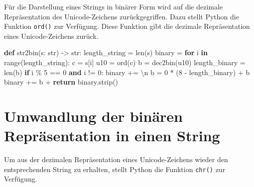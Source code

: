 \documentclass[
  nswissgerman,
  a4paper,
  DIV=11,
  numbers=noendperiod,
  ngerman]{scrreprt}
\newenvironment{Shaded}{\begin{snugshade}}{\end{snugshade}}
\newcommand{\BuiltInTok}[1]{\textcolor[rgb]{0.00,0.23,0.31}{#1}}
\newcommand{\CharTok}[1]{\textcolor[rgb]{0.13,0.47,0.30}{#1}}
\newcommand{\ControlFlowTok}[1]{\textcolor[rgb]{0.00,0.23,0.31}{\textbf{#1}}}
\newcommand{\DecValTok}[1]{\textcolor[rgb]{0.68,0.00,0.00}{#1}}
\newcommand{\KeywordTok}[1]{\textcolor[rgb]{0.00,0.23,0.31}{\textbf{#1}}}
\newcommand{\NormalTok}[1]{\textcolor[rgb]{0.00,0.23,0.31}{#1}}
\newcommand{\OperatorTok}[1]{\textcolor[rgb]{0.37,0.37,0.37}{#1}}
\newcommand{\StringTok}[1]{\textcolor[rgb]{0.13,0.47,0.30}{#1}}
\begin{document}
Für die Darstellung eines Strings in binärer Form wird auf die dezimale
Repräsentation des Unicode-Zeichens zurückgegriffen. Dazu stellt Python
die Funktion \texttt{ord()} zur Verfügung. Diese Funktion gibt die
dezimale Repräsentation eines Unicode-Zeichens zurück.

\begin{Shaded}
\begin{Highlighting}[numbers=left,,]
\KeywordTok{def}\NormalTok{ str2bin(s: }\BuiltInTok{str}\NormalTok{) }\OperatorTok{{-}\textgreater{}} \BuiltInTok{str}\NormalTok{:}
\NormalTok{    length\_string }\OperatorTok{=} \BuiltInTok{len}\NormalTok{(s)}
\NormalTok{    binary }\OperatorTok{=} \StringTok{\textquotesingle{}\textquotesingle{}}
    \ControlFlowTok{for}\NormalTok{ i }\KeywordTok{in} \BuiltInTok{range}\NormalTok{(length\_string):}
\NormalTok{        c }\OperatorTok{=}\NormalTok{ s[i]}
\NormalTok{        u10 }\OperatorTok{=} \BuiltInTok{ord}\NormalTok{(c)}
\NormalTok{        b }\OperatorTok{=}\NormalTok{ dec2bin(u10)}
\NormalTok{        length\_binary }\OperatorTok{=} \BuiltInTok{len}\NormalTok{(b)}
        \ControlFlowTok{if}\NormalTok{ i }\OperatorTok{\%} \DecValTok{5} \OperatorTok{==} \DecValTok{0} \KeywordTok{and}\NormalTok{ i }\OperatorTok{!=} \DecValTok{0}\NormalTok{:}
\NormalTok{            binary }\OperatorTok{+=} \StringTok{\textquotesingle{}}\CharTok{\textbackslash{}n}\StringTok{\textquotesingle{}}
\NormalTok{        b }\OperatorTok{=} \StringTok{\textquotesingle{}0\textquotesingle{}} \OperatorTok{*}\NormalTok{ (}\DecValTok{8} \OperatorTok{{-}}\NormalTok{ length\_binary) }\OperatorTok{+}\NormalTok{ b}
\NormalTok{        binary }\OperatorTok{+=}\NormalTok{ b }\OperatorTok{+} \StringTok{\textquotesingle{} \textquotesingle{}}
    \ControlFlowTok{return}\NormalTok{ binary.strip()}
\end{Highlighting}
\end{Shaded}

\section{Umwandlung der binären Repräsentation in einen
String}\label{umwandlung-der-binuxe4ren-repruxe4sentation-in-einen-string-1}

Um aus der dezimalen Repräsentation eines Unicode-Zeichens wieder den
entsprechenden String zu erhalten, stellt Python die Funktion
\texttt{chr()} zur Verfügung.
\end{document}
